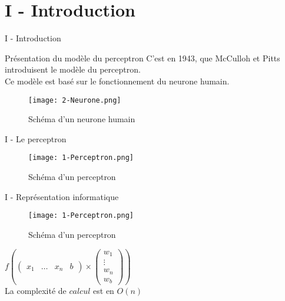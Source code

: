 
\section{I - Introduction}
\begin{frame}{I - Introduction}
	\begin{block}{Présentation du modèle du perceptron}
		C'est  en 1943, que McCulloh et Pitts introduisent le modèle du perceptron.  \\
		Ce modèle est basé sur le fonctionnement du neurone humain.
	\end{block}
	\begin{figure}
		\centering
		\texttt{[image: 2-Neurone.png]}
		\caption{Schéma d'un neurone humain}
	\end{figure}
\end{frame}

\begin{frame}{I - Le perceptron}
	\begin{figure}
		\centering
		\texttt{[image: 1-Perceptron.png]}
		\caption{Schéma d'un perceptron}
	\end{figure}
\end{frame}



\begin{frame}{I - Représentation informatique}
	\begin{figure}
		\centering
		\texttt{[image: 1-Perceptron.png]}
		\caption{Schéma d'un perceptron}
	\end{figure}
	\begin{multicols}{2}
		$
			f
			\left(
			\begin{pmatrix}
					x_1 & \ldots & x_n & b
				\end{pmatrix}
			\times
			\begin{pmatrix}
					w_1    \\
					\vdots \\
					w_n    \\
					w_b
				\end{pmatrix}
			\right)
		$ \\
		La complexité de $calcul$ est en $O(n)$
		\columnbreak
		
	\end{multicols}
\end{frame}